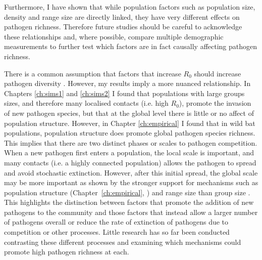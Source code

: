 Furthermore, I have shown that while population factors such as population size, density and range size are directly linked, they have very different effects on pathogen richness.
Therefore future studies should be careful to acknowledge these relationships and, where possible, compare multiple demographic measurements to further test which factors are in fact causally affecting pathogen richness.








There is a common assumption that factors that increase $R_0$ should increase pathogen diversity \cite{nunn2003comparative, morand2000wormy}.
However, my results imply a more nuanced relationship. 
In Chapters \ref{ch:sims1} and \ref{ch:sims2} I found that populations with large groups sizes, and therefore many localised contacts (i.e. high $R_0$), promote the invasion of new pathogen species, but that at the global level there is little or no affect of population structure.
However, in Chapter \ref{ch:empirical} I found that in wild bat populations, population structure does promote global pathogen species richness.
This implies that there are two distinct phases or scales to pathogen competition.
When a new pathogen first enters a population, the local scale is important, and many contacts (i.e. a highly connected population) allows the pathogen to spread and avoid stochastic extinction.
However, after this initial spread, the global scale may be more important as  shown by the stronger support for mechanisms such as population structure (Chapter~\ref{ch:empirical}, \textcite{turmelle2009correlates, maganga2014bat}) and range size \cite{kamiya2014determines, nunn2003comparative} than group size \cite{rifkin2012animals, ezenwa2006host}.
This highlights the distinction between factors that promote the addition of new pathogens to the community and those factors that instead allow a larger number of pathogens overall or reduce the rate of extinction of pathogens due to competition or other processes.
Little research has so far been conducted contrasting these different processes and examining which mechanisms could promote high pathogen richness at each.

